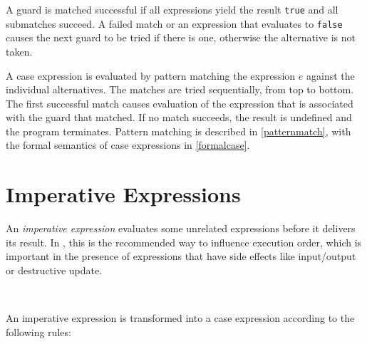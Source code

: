 A guard is matched successful if all expressions yield the result \texttt{true} and all submatches succeed.
A failed match or an expression that evaluates to \texttt{false} causes the next guard to be tried if there is one, otherwise the alternative is not taken.

A case expression is evaluated by pattern matching the expression $e$ against the individual alternatives.
The matches are tried sequentially, from top to bottom.
The first successful match causes evaluation of the expression that is associated with the guard that matched.
If no match succeeds, the result is undefined and the program terminates.
Pattern matching is described in \autoref{patternmatch}, with the formal semantics of case expressions
in \autoref{formalcase}.

\section{Imperative Expressions} 

An \emph{imperative expression} evaluates some unrelated expressions before it delivers its result.
In \frege{}, this is the recommended way to influence execution order, which is important in the presence of expressions that have side effects like input/output or destructive update.


\begin{flushleft}
  \bracea{}  \bracez{}  \\
  \term{$\leftarrow$} 
  \alt {}
\end{flushleft}

An imperative expression is transformed into a case expression according to the following rules:


